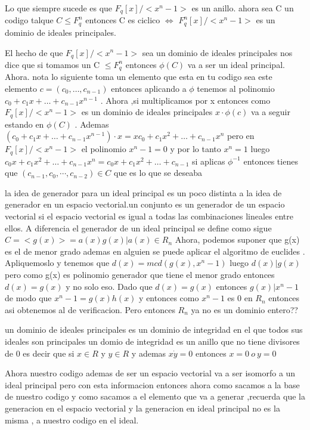 \documentclass[12p]{article}
\begin{document}
Lo que siempre sucede es que $F_q [x]/<x^n - 1 >$ es un anillo.
ahora sea C un codigo talque $C \leq F _q ^ n $ entonces C es ciclico $\iff$ $F_q ^ n [x]/<x^n - 1>$ es 
un dominio de ideales principales.

El hecho de que $F_q[x]/<x^n - 1>$ sea un dominio de ideales principales nos dice que si tomamos un 
C $\leq F _q ^ n $  entonces $\phi(C)$ va a ser un ideal principal.
Ahora. nota lo siguiente toma un elemento que esta en tu codigo sea este elemento $c = (c_0,\dots,c_{n-1})$ 
entonces aplicando a $\phi$ tenemos al polinomio $c_0 + c_1 x + \dots + c_{n-1}x ^{n-1}$ . Ahora ,si 
multiplicamos por x entonces como $F_q[x] / <x^n - 1>$ es un dominio de ideales principales
$x\cdot\phi(c)$  va a seguir estando en $\phi(C)$ . Ademas
$(c_0 + c_1 x + \dots + c_{n-1}x ^{n-1})\cdot x  = xc_0 + c_1 x^2 + \dots + c _{n-1}x^{n}$ 
pero en $F_q[x]/<x^n-1>$ el polinomio $x^n - 1 = 0 $
y por lo tanto $x^ n = 1$ luego $c_0 x+ c_1 x^2 + \dots + c _{n-1}x^{n} = c_0 x + c_1x^2 + \dots + c_{n-1} $
si aplicas $\phi^{-1}$ entonces tienes que $(c_{n-1},c_0,\cdots,c_{n-2}) \in C$ que es lo que se deseaba

la idea de generador para un ideal principal es un poco distinta a la idea de generador en 
un espacio vectorial.un conjunto es un generador de un espacio vectorial si el espacio vectorial es 
igual a todas las combinaciones lineales entre ellos. A diferencia el generador de un ideal principal se 
define como sigue $ C = <g(x)> = {a(x)g(x)| a(x) \in R_n}$ 
Ahora, podemos suponer que g(x) es el de menor grado ademas en alguien se puede aplicar el algoritmo de 
euclides . Apliquemoslo y tenemos que $d(x) = mcd(g(x),x^n - 1)$ luego $d(x)|g(x)$ pero como 
g(x) es polinomio generador que tiene el menor grado entonces $d(x) = g(x)$ y no solo eso. Dado que 
$d(x) = g(x)$ entonces $g(x)|x^n - 1$ de modo que $x^n - 1 = g(x)h(x)$ y entonces como $x^n - 1$ es 0 
en $R_n$ entonces asi obtenemos al de verificacion. 
Pero entonces $R_n$ ya no es un dominio entero??

un dominio de ideales principales es un dominio de integridad en el que todos sus ideales son principales 
un domio de integridad es un anillo que no tiene divisores de 0 es decir que si $ x \in R $ y $ y \in R $
y ademas $x\dot y = 0 $ entonces $x = 0 \ o \ y = 0$


Ahora nuestro codigo ademas de ser un espacio vectorial va a ser isomorfo a un ideal principal
pero con esta informacion entonces ahora como sacamos a la base de nuestro codigo y como sacamos 
a el elemento que va a generar ,recuerda que la generacion en el espacio vectorial y la 
generacion en ideal principal no es la misma , a nuestro codigo en el ideal.
\end{document}
